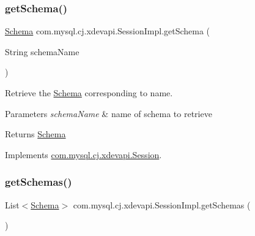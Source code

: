 \mbox{\label{classcom_1_1mysql_1_1cj_1_1xdevapi_1_1_session_impl_aeb00f17f0c469af51f790c4a73666904}} 
\subsubsection{\texorpdfstring{get\+Schema()}{getSchema()}}
{\footnotesize\ttfamily \mbox{\hyperlink{interfacecom_1_1mysql_1_1cj_1_1xdevapi_1_1_schema}{Schema}} com.\+mysql.\+cj.\+xdevapi.\+Session\+Impl.\+get\+Schema (\begin{DoxyParamCaption}\item[{String}]{schema\+Name }\end{DoxyParamCaption})}

Retrieve the \mbox{\hyperlink{interfacecom_1_1mysql_1_1cj_1_1xdevapi_1_1_schema}{Schema}} corresponding to name.


\begin{DoxyParams}{Parameters}
{\em schema\+Name} & name of schema to retrieve \\
\hline
\end{DoxyParams}
\begin{DoxyReturn}{Returns}
\mbox{\hyperlink{interfacecom_1_1mysql_1_1cj_1_1xdevapi_1_1_schema}{Schema}} 
\end{DoxyReturn}


Implements \mbox{\hyperlink{interfacecom_1_1mysql_1_1cj_1_1xdevapi_1_1_session_a70703d4853bdfee2b32da36a27fa2e52}{com.\+mysql.\+cj.\+xdevapi.\+Session}}.

\mbox{\label{classcom_1_1mysql_1_1cj_1_1xdevapi_1_1_session_impl_a2d607f33ef3231038642b5836b813531}} 
\subsubsection{\texorpdfstring{get\+Schemas()}{getSchemas()}}
{\footnotesize\ttfamily List$<$\mbox{\hyperlink{interfacecom_1_1mysql_1_1cj_1_1xdevapi_1_1_schema}{Schema}}$>$ com.\+mysql.\+cj.\+xdevapi.\+Session\+Impl.\+get\+Schemas (\begin{DoxyParamCaption}{ }\end{DoxyParamCaption})}

